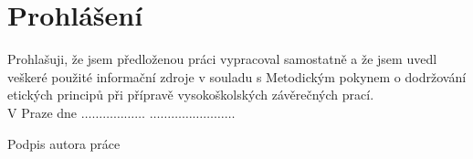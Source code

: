 \null \vfill{}
\section*{Prohlášení}
		

Prohlašuji, že jsem předloženou práci vypracoval samostatně a že jsem uvedl veškeré použité informační zdroje v souladu s Metodickým pokynem o dodržování etických principů při přípravě vysokoškolských závěrečných prací.\\[0.5cm]

V Praze dne $\dots\dots\dots\dots \dots\dots$ \hspace{2.5cm}$ \dots\dots\dots\dots \dots\dots\dots\dots$

\hspace{8.6cm}Podpis autora práce
\begin{figure}[!h]
	\begin{flushright}
	\end{flushright}
\end{figure}
\\